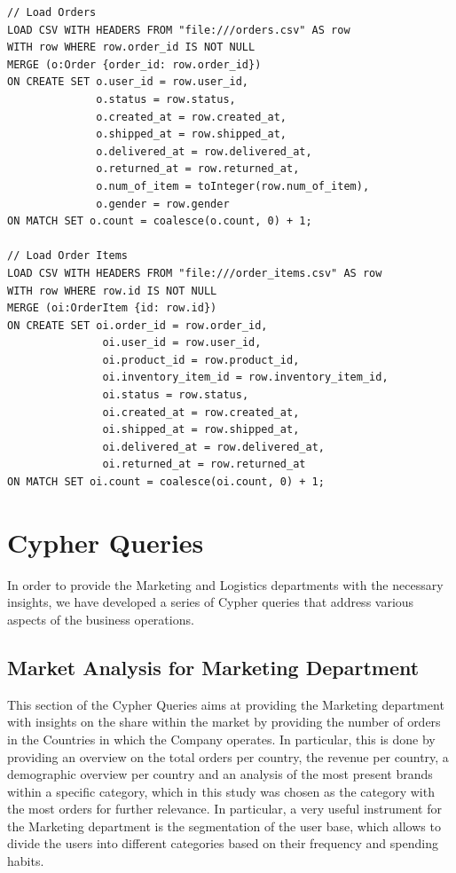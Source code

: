 \documentclass[a4paper,12pt]{article}
\begin{document}
\begin{verbatim}
// Load Orders
LOAD CSV WITH HEADERS FROM "file:///orders.csv" AS row
WITH row WHERE row.order_id IS NOT NULL
MERGE (o:Order {order_id: row.order_id})
ON CREATE SET o.user_id = row.user_id,
              o.status = row.status,
              o.created_at = row.created_at,
              o.shipped_at = row.shipped_at,
              o.delivered_at = row.delivered_at,
              o.returned_at = row.returned_at,
              o.num_of_item = toInteger(row.num_of_item),
              o.gender = row.gender
ON MATCH SET o.count = coalesce(o.count, 0) + 1;

// Load Order Items
LOAD CSV WITH HEADERS FROM "file:///order_items.csv" AS row
WITH row WHERE row.id IS NOT NULL
MERGE (oi:OrderItem {id: row.id})
ON CREATE SET oi.order_id = row.order_id,
               oi.user_id = row.user_id,
               oi.product_id = row.product_id,
               oi.inventory_item_id = row.inventory_item_id,
               oi.status = row.status,
               oi.created_at = row.created_at,
               oi.shipped_at = row.shipped_at,
               oi.delivered_at = row.delivered_at,
               oi.returned_at = row.returned_at
ON MATCH SET oi.count = coalesce(oi.count, 0) + 1;
\end{verbatim}

\section{Cypher Queries}
In order to provide the Marketing and Logistics departments with the necessary insights, we have developed a series of Cypher queries that address various aspects of the business operations.
\subsection{Market Analysis for Marketing Department}
This section of the Cypher Queries aims at providing the Marketing department with insights on the share within the market by providing the number of orders in the Countries in which the Company operates.
In particular, this is done by providing an overview on the total orders per country, the revenue per country, a demographic overview per country and an analysis of the most present brands within a specific 
category, which in this study was chosen as the category with the most orders for further relevance.
In particular, a very useful instrument for the Marketing department is the segmentation of the user base, which allows to divide the users into different categories based on their frequency and spending habits.
\end{document}
